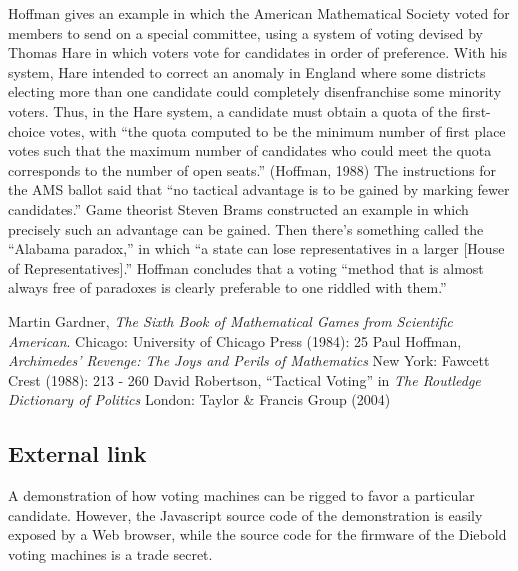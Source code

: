 \documentclass[12pt]{article}
\begin{document}
Hoffman gives an example in which the American Mathematical Society voted for members to send on a special committee, using a system of voting devised by Thomas Hare in which voters vote for candidates in order of preference. With his system, Hare intended to correct an anomaly in England where some districts electing more than one candidate could completely disenfranchise some minority voters. Thus, in the Hare system, a candidate must obtain a quota of the first-choice votes, with ``the quota computed to be the minimum number of first place votes such that the maximum number of candidates who could meet the quota corresponds to the number of open seats.'' (Hoffman, 1988) The instructions for the AMS ballot said that ``no tactical advantage is to be gained by marking fewer candidates.'' Game theorist Steven Brams constructed an example in which precisely such an advantage can be gained. Then there's something called the ``Alabama paradox,'' in which ``a state can lose representatives in a larger [House of Representatives].'' Hoffman concludes that a voting ``method that is almost always free of paradoxes is clearly preferable to one riddled with them.''

\begin{thebibliography}{3}
 Martin Gardner, {\it The Sixth Book of Mathematical Games from Scientific American}. Chicago: University of Chicago Press (1984): 25
 Paul Hoffman, {\it Archimedes' Revenge: The Joys and Perils of Mathematics} New York: Fawcett Crest (1988): 213 - 260
 David Robertson, ``Tactical Voting'' in {\it The Routledge Dictionary of Politics} London: Taylor \& Francis Group (2004)
\end{thebibliography}

\subsection{External link}

 A demonstration of how voting machines can be rigged to favor a particular candidate. However, the Javascript source code of the demonstration is easily exposed by a Web browser, while the source code for the firmware of the Diebold voting machines is a trade secret.
\end{document}
